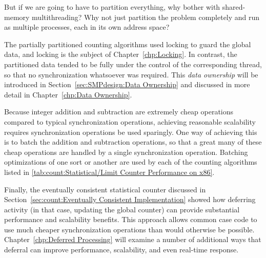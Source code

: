 \QuickQuiz{}
	But if we are going to have to partition everything, why bother
	with shared-memory multithreading?
	Why not just partition the problem completely and run as
	multiple processes, each in its own address space?
 \QuickQuizEnd

The partially partitioned counting algorithms used locking to
guard the global data, and locking is the subject of
Chapter~\ref{chp:Locking}.
In contrast, the partitioned data tended to be fully under the control of
the corresponding thread, so that no synchronization whatsoever was required.
This \emph{data ownership} will be introduced in
Section~\ref{sec:SMPdesign:Data Ownership}
and discussed in more detail in
Chapter~\ref{chp:Data Ownership}.

Because integer addition and subtraction are extremely cheap operations
compared to typical synchronization operations, achieving reasonable
scalability requires synchronization operations be used sparingly.
One way of achieving this is to batch the addition and subtraction
operations, so that a great many of these cheap operations are handled
by a single synchronization operation.
Batching optimizations of one sort or another are used by each of
the counting algorithms listed in
\cref{tab:count:Statistical/Limit Counter Performance on x86}.

Finally, the eventually consistent statistical counter discussed in
Section~\ref{sec:count:Eventually Consistent Implementation}
showed how deferring activity (in that case, updating the global
counter) can provide substantial performance and scalability benefits.
This approach allows common case code to use much cheaper synchronization
operations than would otherwise be possible.
Chapter~\ref{chp:Deferred Processing} will examine a number of additional
ways that deferral can improve performance, scalability, and even
real-time response.


